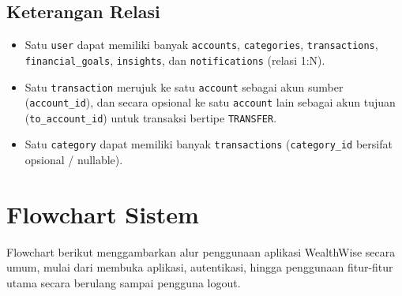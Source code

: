 \documentclass[11pt]{article}
\begin{document}
\subsection{Keterangan Relasi}
\begin{itemize}
\item Satu \texttt{user} dapat memiliki banyak \texttt{accounts}, \texttt{categories}, \texttt{transactions}, \texttt{financial\_goals}, \texttt{insights}, dan \texttt{notifications} (relasi 1:N).
\item Satu \texttt{transaction} merujuk ke satu \texttt{account} sebagai akun sumber (\texttt{account\_id}), dan secara opsional ke satu \texttt{account} lain sebagai akun tujuan (\texttt{to\_account\_id}) untuk transaksi bertipe \texttt{TRANSFER}.
\item Satu \texttt{category} dapat memiliki banyak \texttt{transactions} (\texttt{category\_id} bersifat opsional / nullable).
\end{itemize}

\newpage
\section{Flowchart Sistem}

Flowchart berikut menggambarkan alur penggunaan aplikasi WealthWise secara umum, mulai dari membuka aplikasi, autentikasi, hingga penggunaan fitur-fitur utama secara berulang sampai pengguna logout.
\end{document}
